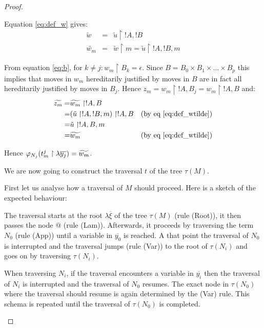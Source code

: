 \begin{proof}
\begin{itemize}
    Equation \ref{eq:def_w} gives:
    \begin{eqnarray}
        \tilde{w} &=& \tilde{u} \upharpoonright !A,!B  \nonumber \\
        \widetilde{w_m} &=& \tilde{w}\upharpoonright m  = \tilde{u} \upharpoonright !A,!B,m
        \label{eq:def_wtilde}
    \end{eqnarray}

    From equation \ref{eq:b}, for $k\neq j : w_m \upharpoonright B_k = \epsilon$. Since $B =
    B_0 \times B_1 \times \ldots \times B_p$ this implies that moves in $w_m$ hereditarily justified by moves in $B$ are in fact all
    hereditarily justified by moves in $B_j$.  Hence $z_m = w_m \upharpoonright !A, B_j = w_m \upharpoonright !A, B$ and:
    \begin{eqnarray*}
            \widetilde{z_m} =& \widetilde{w_m} \upharpoonright !A,B \\
            =& (\tilde{u} \upharpoonright !A,!B,m) \upharpoonright !A,B &\mbox{(by eq \ref{eq:def_wtilde})} \\
            =& \tilde{u} \upharpoonright !A,B,m \\
            =& \widetilde{w_m}  & \mbox{(by eq \ref{eq:def_wtilde})}
    \end{eqnarray*}


    Hence $\varphi_{N_j}(t^j_m \upharpoonright \lambda \overline{y_j} ) = \widetilde{w_m}$.





    We are now going to construct the traversal $t$ of the
    tree $\tau(M)$.

    First let us analyse how a traversal of $M$ should proceed.
    Here is a sketch of the expected behaviour:

    The traversal starts at the root $\lambda \overline{\xi}$ of the tree $\tau(M)$ (rule
    (Root)), it then passes the node $@$ (rule (Lam)). Afterwards, it proceeds by traversing the term $N_0$ (rule (App))
    until a variable in $\overline{y_0}$ is reached. A that point the traversal
    of $N_0$ is interrupted and the traversal jumps (rule (Var)) to the root of $\tau(N_i)$ and goes on by traversing $\tau(N_i)$.

    When traversing $N_i$, if the traversal encounters a variable in $\overline{y_i}$ then the traversal of $N_i$ is interrupted and
    the traversal of $N_0$ resumes. The exact node in $\tau(N_0)$ where the traversal should resume is again determined by the (Var) rule.
    This schema is repeated until the traversal of $\tau(N_0)$ is completed.


\end{itemize}
\end{proof}
